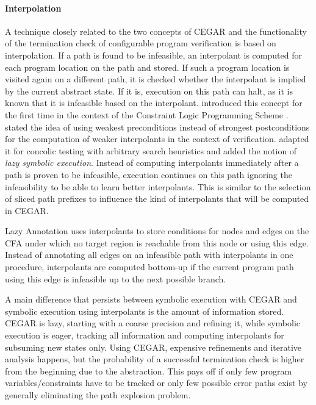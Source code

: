 \paragraph*{Interpolation}
A technique closely related to the two concepts of CEGAR and the functionality of the termination check of configurable program verification is based on interpolation.
If a path is found to be infeasible, an interpolant is computed for each program location on the path and stored.
If such a program location is visited again on a different path, it is checked whether the interpolant is implied by the current abstract state.
If it is, execution on this path can halt, as it is known that it is infeasible based on the interpolant.
\cite{Jaffar2009} introduced this concept for the first time in the context of the Constraint Logic Programming Scheme \cite{Jaffar1992}.
\cite{Jaffar2012} stated the idea of using weakest preconditions instead of strongest postconditions for the computation of weaker interpolants in the context of verification.
\cite{Jaffar2013} adapted it for concolic testing with arbitrary search heuristics and
\cite{Chu2014} added the notion of \emph{lazy symbolic execution}.
Instead of computing interpolants immediately after a path is proven to be infeasible, execution continues on this path ignoring the infeasibility to be able to learn better interpolants.
This is similar to the selection of sliced path prefixes \cite{Beyer2015} to influence the kind of interpolants that will be computed in CEGAR.

Lazy Annotation \cite{McMillan2010} uses interpolants to store conditions for nodes and edges on the CFA under which no target region is reachable from this node or using this edge.
Instead of annotating all edges on an infeasible path with interpolants in one procedure, interpolants are computed bottom-up if the current program path using this edge is infeasible up to the next possible branch.

A main difference that persists between symbolic execution with CEGAR and symbolic execution using interpolants is the amount of information stored.
CEGAR is lazy, starting with a coarse precision and refining it, while symbolic execution is eager,
tracking all information and computing interpolants for subsuming new states only.
Using CEGAR, expensive refinements and iterative analysis happens,
but the probability of a successful termination check is higher from the beginning due to the abstraction.
This pays off if only few program variables/constraints have to be tracked or only few possible error paths exist
by generally eliminating the path explosion problem.


